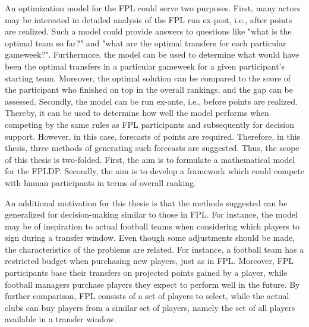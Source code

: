 \newpar

An optimization model for the FPL could serve two purposes. First, many actors may be interested in detailed analysis of the FPL run ex-post, i.e., after points are realized. Such a model could provide answers to questions like "what is the optimal team so far?" and "what are the optimal transfers for each particular gameweek?". Furthermore, the model can be used to determine what would have been the optimal transfers in a particular gameweek for a given participant's starting team. Moreover, the optimal solution can be compared to the score of the participant who finished on top in the overall rankings, and the gap can be assessed. Secondly, the model can be run ex-ante, i.e., before points are realized. Thereby, it can be used to determine how well the model performs when competing by the same rules as FPL participants and subsequently for decision support. However, in this case, forecasts of points are required. Therefore, in this thesis, three methods of generating such forecasts are suggested. Thus, the scope of this thesis is two-folded. First, the aim is to formulate a mathematical model for the FPLDP. Secondly, the aim is to develop a framework which could compete with human participants in terms of overall ranking.

\newpar

\newpage
An additional motivation for this thesis is that the methods suggested can be generalized for decision-making similar to those in FPL. For instance, the model may be of inspiration to actual football teams when considering which players to sign during a transfer window. Even though some adjustments should be made, the characteristics of the problems are related. For instance, a football team has a restricted budget when purchasing new players, just as in FPL. Moreover, FPL participants base their transfers on projected points gained by a player, while football managers purchase players they expect to perform well in the future. By further comparison, FPL consists of a set of players to select, while the actual clubs can buy players from a similar set of players, namely the set of all players available in a transfer window.

\newpar


